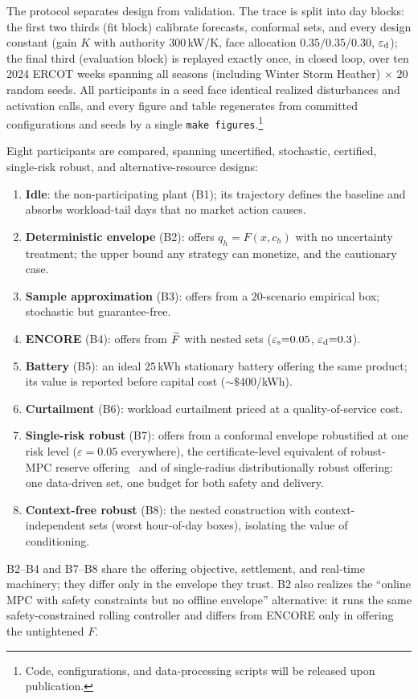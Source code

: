 The protocol separates design from validation. The trace is split into day
blocks: the first two thirds (fit block) calibrate forecasts, conformal sets,
and every design constant (gain $K$ with authority $300$\,kW/K, face
allocation $0.35/0.35/0.30$, $\varepsilon_{\mathrm{d}}$); the final third (evaluation block) is
replayed exactly once, in closed loop, over ten 2024 ERCOT weeks spanning all
seasons (including Winter Storm Heather) $\times$ $20$ random seeds. All
participants in a seed face identical realized disturbances and activation
calls, and every figure and table regenerates from committed configurations
and seeds by a single \texttt{make figures}.\footnote{Code, configurations,
and data-processing scripts will be released upon publication.}

Eight participants are compared, spanning uncertified, stochastic,
certified, single-risk robust, and alternative-resource designs:
\begin{enumerate}
\item \textbf{Idle}: the non-participating plant (B1); its trajectory defines
the baseline and absorbs workload-tail days that no market action causes.
\item \textbf{Deterministic envelope} (B2): offers $q_h = F(x,c_h)$ with no
uncertainty treatment; the upper bound any strategy can monetize, and the
cautionary case.
\item \textbf{Sample approximation} (B3): offers from a $20$-scenario
empirical box; stochastic but guarantee-free.
\item \textbf{ENCORE} (B4): offers from $\widetilde{F}$ with nested sets
($\varepsilon_{\mathrm{s}}{=}0.05$, $\varepsilon_{\mathrm{d}}{=}0.3$).
\item \textbf{Battery} (B5): an ideal $25$\,kWh stationary battery offering
the same product; its value is reported before capital cost
(${\sim}\$400$/kWh).
\item \textbf{Curtailment} (B6): workload curtailment priced at a
quality-of-service cost.
\item \textbf{Single-risk robust} (B7): offers from a conformal envelope
robustified at one risk level ($\varepsilon=0.05$ everywhere), the
certificate-level equivalent of robust-MPC reserve
offering~\cite{vrettos2016robust} and of single-radius distributionally
robust offering: one data-driven set, one budget for both safety and
delivery.
\item \textbf{Context-free robust} (B8): the nested construction with
context-independent sets (worst hour-of-day boxes), isolating the value of
conditioning.
\end{enumerate}
B2--B4 and B7--B8 share the offering objective, settlement, and real-time
machinery; they differ only in the envelope they trust. B2 also realizes
the ``online MPC with safety constraints but no offline envelope''
alternative: it runs the same safety-constrained rolling controller and
differs from ENCORE only in offering the untightened $F$.

